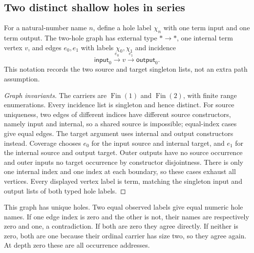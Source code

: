 \subsection{Two distinct shallow holes in series}
For a natural-number name $n$, define a hole label $\chi_n$ with one term input
and one term output. The two-hole graph has external type $*\to *$, one internal
term vertex $v$, and edges $e_0,e_1$ with labels $\chi_0,\chi_1$ and incidence
\[
 \mathsf{input}_0\xrightarrow{e_0}v\xrightarrow{e_1}\mathsf{output}_0.
\]
This notation records the two source and target singleton lists, not an extra
path assumption.
\begin{proof}[Graph invariants]
The carriers are $\operatorname{Fin}(1)$ and $\operatorname{Fin}(2)$, with finite
range enumerations. Every incidence list is singleton and hence distinct.
For source uniqueness, two edges of different indices have different source
constructors, namely input and internal, so a shared source is impossible;
equal-index cases give equal edges. The target argument uses internal and output
constructors instead. Coverage chooses $e_0$ for the input source and internal
target, and $e_1$ for the internal source and output target. Outer outputs have
no source occurrence and outer inputs no target occurrence by constructor
disjointness. There is only one internal index and one index at each boundary,
so these cases exhaust all vertices. Every displayed vertex label is term,
matching the singleton input and output lists of both typed hole labels.
\end{proof}

This graph has unique holes. Two equal observed labels give equal numeric hole
names. If one edge index is zero and the other is not, their names are respectively
zero and one, a contradiction. If both are zero they agree directly. If neither
is zero, both are one because their ordinal carrier has size two, so they agree
again. At depth zero these are all occurrence addresses.

